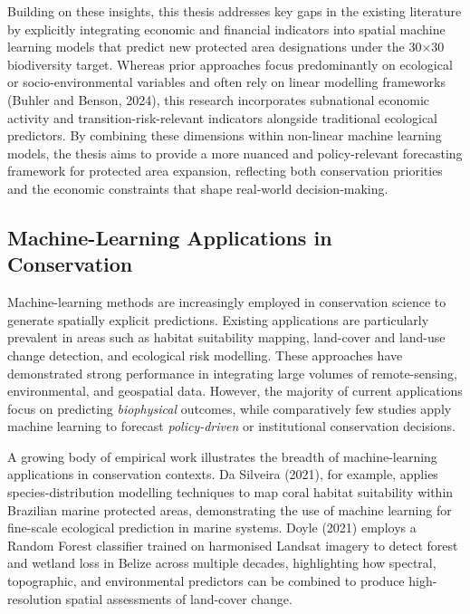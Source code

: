 \documentclass[12pt]{article}
\theoremstyle{break} %
\begin{document}
Building on these insights, this thesis addresses key gaps in the existing literature by explicitly integrating economic and financial indicators into spatial machine learning models that predict new protected area designations under the 30×30 biodiversity target. Whereas prior approaches focus predominantly on ecological or socio-environmental variables and often rely on linear modelling frameworks (Buhler and Benson, 2024), this research incorporates subnational economic activity and transition-risk-relevant indicators alongside traditional ecological predictors. By combining these dimensions within non-linear machine learning models, the thesis aims to provide a more nuanced and policy-relevant forecasting framework for protected area expansion, reflecting both conservation priorities and the economic constraints that shape real-world decision-making.

\subsection{Machine-Learning Applications in Conservation} \label{ml-conservation}

Machine-learning methods are increasingly employed in conservation science to generate spatially explicit predictions. Existing applications are particularly prevalent in areas such as habitat suitability mapping, land-cover and land-use change detection, and ecological risk modelling. These approaches have demonstrated strong performance in integrating large volumes of remote-sensing, environmental, and geospatial data. However, the majority of current applications focus on predicting \textit{biophysical} outcomes, while comparatively few studies apply machine learning to forecast \textit{policy-driven} or institutional conservation decisions.

A growing body of empirical work illustrates the breadth of machine-learning applications in conservation contexts. Da Silveira (2021), for example, applies species-distribution modelling techniques to map coral habitat suitability within Brazilian marine protected areas, demonstrating the use of machine learning for fine-scale ecological prediction in marine systems. Doyle (2021) employs a Random Forest classifier trained on harmonised Landsat imagery to detect forest and wetland loss in Belize across multiple decades, highlighting how spectral, topographic, and environmental predictors can be combined to produce high-resolution spatial assessments of land-cover change.
\end{document}
